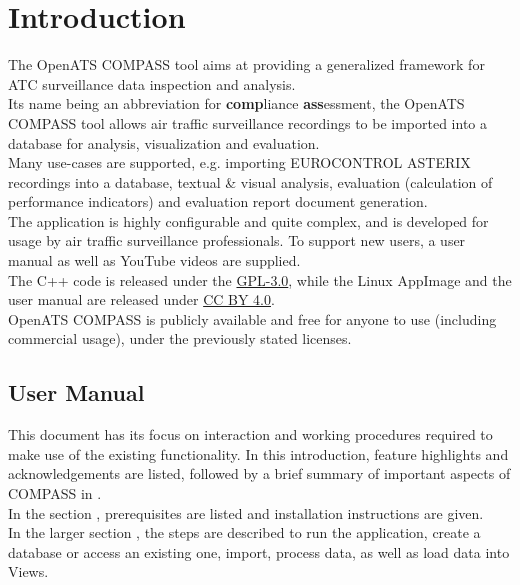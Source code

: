\chapter{Introduction}

The OpenATS COMPASS tool aims at providing a generalized framework for ATC surveillance data inspection and analysis. \\

Its name being an abbreviation for \textbf{comp}liance \textbf{ass}essment, the OpenATS COMPASS tool allows air traffic surveillance recordings to be imported into a database for analysis, visualization and evaluation. \\

Many use-cases are supported, e.g. importing EUROCONTROL ASTERIX recordings into a database, textual \& visual analysis, evaluation (calculation of performance indicators) and evaluation report document generation. \\

The application is highly configurable and quite complex, and is developed for usage by air traffic surveillance professionals. To support new users, a user manual as well as YouTube videos are supplied. \\

The C++ code is released under the \href{https://www.gnu.org/licenses/gpl-3.0.en.html}{GPL-3.0}, while the Linux AppImage and the user manual are released under \href{https://creativecommons.org/licenses/by/4.0/}{CC BY 4.0}. \\

OpenATS COMPASS is publicly available and free for anyone to use (including commercial usage), under the previously stated licenses.

\section{User Manual}

This document has its focus on interaction and working procedures required to make use of the existing
functionality. In this introduction, feature highlights and acknowledgements are listed, followed by a brief summary of important aspects of  COMPASS in . \\

In the section , prerequisites are listed and installation instructions are given. \\

In the larger section , the steps are described to run the application, create a database or access an existing one, import, process data, as well as load data into Views. \\

